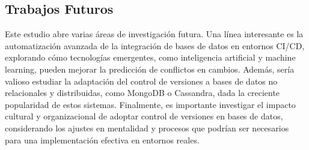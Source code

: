 \documentclass{IEEEtran}
\begin{document}
\subsection{Trabajos Futuros}
Este estudio abre varias áreas de investigación futura. Una línea interesante es la automatización avanzada de la integración de bases de datos en entornos CI/CD, explorando cómo tecnologías emergentes, como inteligencia artificial y machine learning, pueden mejorar la predicción de conflictos en cambios. Además, sería valioso estudiar la adaptación del control de versiones a bases de datos no relacionales y distribuidas, como MongoDB o Cassandra, dada la creciente popularidad de estos sistemas. Finalmente, es importante investigar el impacto cultural y organizacional de adoptar control de versiones en bases de datos, considerando los ajustes en mentalidad y procesos que podrían ser necesarios para una implementación efectiva en entornos reales.


\renewcommand{\refname}{Referencias}
\nocite{}



    
\end{document}

